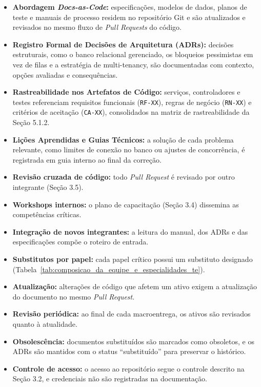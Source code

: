 
\begin{itemize}
\item \textbf{Abordagem \emph{Docs-as-Code}:} especificações, modelos de dados, planos de teste e manuais de processo residem no repositório Git e são atualizados e revisados no mesmo fluxo de \emph{Pull Requests} do código.
\item \textbf{Registro Formal de Decisões de Arquitetura (ADRs):} decisões estruturais, como o banco relacional gerenciado, os bloqueios pessimistas em vez de filas e a estratégia de multi-tenancy, são documentadas com contexto, opções avaliadas e consequências.
\item \textbf{Rastreabilidade nos Artefatos de Código:} serviços, controladores e testes referenciam requisitos funcionais (\texttt{RF-XX}), regras de negócio (\texttt{RN-XX}) e critérios de aceitação (\texttt{CA-XX}), consolidados na matriz de rastreabilidade da Seção 5.1.2.
\item \textbf{Lições Aprendidas e Guias Técnicos:} a solução de cada problema relevante, como limites de conexão no banco ou ajustes de concorrência, é registrada em guia interno ao final da correção.
\end{itemize}


\begin{itemize}
\item \textbf{Revisão cruzada de código:} todo \emph{Pull Request} é revisado por outro integrante (Seção 3.5).
\item \textbf{Workshops internos:} o plano de capacitação (Seção 3.4) dissemina as competências críticas.
\item \textbf{Integração de novos integrantes:} a leitura do manual, dos ADRs e das especificações compõe o roteiro de entrada.
\item \textbf{Substitutos por papel:} cada papel crítico possui um substituto designado (Tabela~\ref{tab:composicao_da_equipe_e_especialidades_te}).
\end{itemize}


\begin{itemize}
\item \textbf{Atualização:} alterações de código que afetem um ativo exigem a atualização do documento no mesmo \emph{Pull Request}.
\item \textbf{Revisão periódica:} ao final de cada macroentrega, os ativos são revisados quanto à atualidade.
\item \textbf{Obsolescência:} documentos substituídos são marcados como obsoletos, e os ADRs são mantidos com o status ``substituído'' para preservar o histórico.
\item \textbf{Controle de acesso:} o acesso ao repositório segue o controle descrito na Seção 3.2, e credenciais não são registradas na documentação.
\end{itemize}

